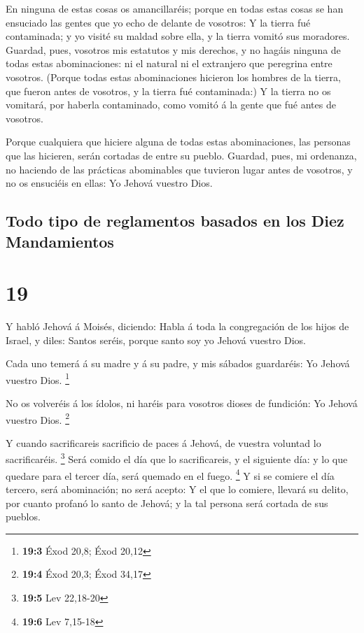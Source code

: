  En ninguna de estas cosas os amancillaréis; porque en
todas estas cosas se han ensuciado las gentes que yo echo de delante de
vosotros:  Y la tierra fué contaminada; y yo visité su
maldad sobre ella, y la tierra vomitó sus moradores. 
Guardad, pues, vosotros mis estatutos y mis derechos, y no hagáis
ninguna de todas estas abominaciones: ni el natural ni el extranjero que
peregrina entre vosotros.  (Porque todas estas
abominaciones hicieron los hombres de la tierra, que fueron antes de
vosotros, y la tierra fué contaminada:)  Y la tierra no os
vomitará, por haberla contaminado, como vomitó á la gente que fué antes
de vosotros.

 Porque cualquiera que hiciere alguna de todas estas
abominaciones, las personas que las hicieren, serán cortadas de entre su
pueblo.  Guardad, pues, mi ordenanza, no haciendo de las
prácticas abominables que tuvieron lugar antes de vosotros, y no os
ensuciéis en ellas: Yo Jehová vuestro Dios.

\hypertarget{todo-tipo-de-reglamentos-basados-en-los-diez-mandamientos}{%
\subsection{Todo tipo de reglamentos basados \hspace{0pt}\hspace{0pt}en
los Diez
Mandamientos}\label{todo-tipo-de-reglamentos-basados-en-los-diez-mandamientos}}

\hypertarget{section-18}{%
\section{19}\label{section-18}}

 Y habló Jehová á Moisés, diciendo:  Habla á
toda la congregación de los hijos de Israel, y diles: Santos seréis,
porque santo soy yo Jehová vuestro Dios.

 Cada uno temerá á su madre y á su padre, y mis sábados
guardaréis: Yo Jehová vuestro Dios. \footnote{\textbf{19:3} Éxod 20,8;
  Éxod 20,12}

 No os volveréis á los ídolos, ni haréis para vosotros
dioses de fundición: Yo Jehová vuestro Dios. \footnote{\textbf{19:4}
  Éxod 20,3; Éxod 34,17}

 Y cuando sacrificareis sacrificio de paces á Jehová, de
vuestra voluntad lo sacrificaréis. \footnote{\textbf{19:5} Lev 22,18-20}
 Será comido el día que lo sacrificareis, y el siguiente
día: y lo que quedare para el tercer día, será quemado en el fuego.
\footnote{\textbf{19:6} Lev 7,15-18}  Y si se comiere el día
tercero, será abominación; no será acepto:  Y el que lo
comiere, llevará su delito, por cuanto profanó lo santo de Jehová; y la
tal persona será cortada de sus pueblos.

